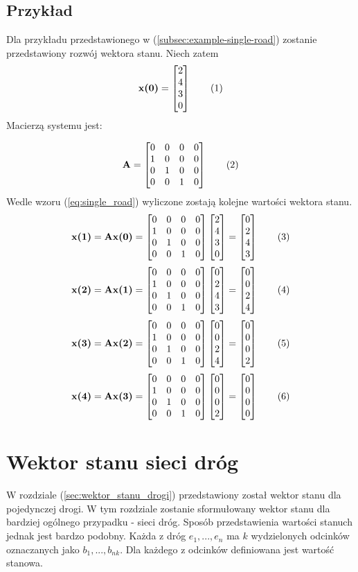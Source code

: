 \documentclass[12pt]{book}
\theoremstyle{plain}
\newcommand\addtag{\refstepcounter{equation}
\renewcommand{\labelenumii}{\theenumii}
\renewcommand{\theenumii}{\theenumi.\arabic{enumii}.}
\tag{\theequation}}
\begin{document}
\subsection{Przykład}
Dla przykładu przedstawionego w (\ref{subsec:example-single-road}) zostanie przedstawiony rozwój wektora stanu. Niech zatem
\def \xZero {\begin{bmatrix}
	2 \\ 4 \\ 3 \\ 0
	\end{bmatrix}}
\[\textbf{x(0)}=\xZero \addtag \]
Macierzą systemu jest:
\def \A {\begin{bmatrix}
		0 & 0 & 0 & 0 \\
		1 & 0 & 0 & 0 \\
		0 & 1 & 0 & 0 \\
		0 & 0 & 1 & 0 \\
\end{bmatrix}}

\[
\textbf{A}=\A \addtag
\]
Wedle wzoru (\ref{eq:single_road}) wyliczone zostają kolejne wartości wektora stanu.
\def \xI {\begin{bmatrix}
		0 \\ 2 \\ 4 \\ 3
\end{bmatrix}}
\[
\textbf{x(1)}=\textbf{Ax(0)}=\A \xZero = \xI \addtag
\]
\def \xII {\begin{bmatrix}
		0 \\ 0 \\ 2 \\ 4
\end{bmatrix}}
\[
\textbf{x(2)}=\textbf{Ax(1)}=\A \xI = \xII \addtag
\]
\def \xIII {\begin{bmatrix}
		0 \\ 0 \\ 0 \\ 2
\end{bmatrix}}
\[
\textbf{x(3)}=\textbf{Ax(2)}=\A \xII = \xIII \addtag
\]
\def \xIV {\begin{bmatrix}
		0 \\ 0 \\ 0 \\ 0
\end{bmatrix}}
\[
\textbf{x(4)}=\textbf{Ax(3)}=\A \xIII = \xIV \addtag
\]

\section {Wektor stanu sieci dróg}
W rozdziale (\ref{sec:wektor_stanu_drogi}) przedstawiony został wektor stanu dla pojedynczej drogi. W tym rozdziale zostanie sformułowany wektor stanu dla bardziej ogólnego przypadku - sieci dróg. Sposób przedstawienia wartości stanuch jednak jest bardzo podobny. Każda z dróg $e_1,...,e_n$ ma $k$ wydzielonych odcinków oznaczanych jako $b_1,...,b_{nk}$. Dla każdego z odcinków definiowana jest wartość stanowa.
\end{document}
